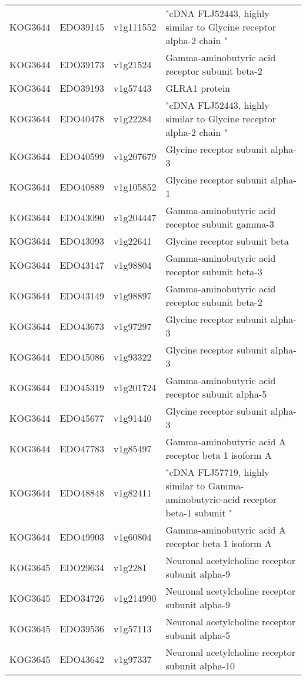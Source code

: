 \begin{longtable}[l]{lll>{\raggedright\arraybackslash}p{30em}}
\rowcolor{gray!6}  KOG3644 & EDO39145 & v1g111552 & "cDNA FLJ52443, highly similar to Glycine receptor alpha-2 chain "\\
KOG3644 & EDO39173 & v1g21524 & Gamma-aminobutyric acid receptor subunit beta-2\\
\rowcolor{gray!6}  KOG3644 & EDO39193 & v1g57443 & GLRA1 protein\\
KOG3644 & EDO40478 & v1g22284 & "cDNA FLJ52443, highly similar to Glycine receptor alpha-2 chain "\\
\rowcolor{gray!6}  KOG3644 & EDO40599 & v1g207679 & Glycine receptor subunit alpha-3\\
KOG3644 & EDO40889 & v1g105852 & Glycine receptor subunit alpha-1\\
\rowcolor{gray!6}  KOG3644 & EDO43090 & v1g204447 & Gamma-aminobutyric acid receptor subunit gamma-3\\
KOG3644 & EDO43093 & v1g22641 & Glycine receptor subunit beta\\
\rowcolor{gray!6}  KOG3644 & EDO43147 & v1g98804 & Gamma-aminobutyric acid receptor subunit beta-3\\
KOG3644 & EDO43149 & v1g98897 & Gamma-aminobutyric acid receptor subunit beta-2\\
\rowcolor{gray!6}  KOG3644 & EDO43673 & v1g97297 & Glycine receptor subunit alpha-3\\
KOG3644 & EDO45086 & v1g93322 & Glycine receptor subunit alpha-3\\
\rowcolor{gray!6}  KOG3644 & EDO45319 & v1g201724 & Gamma-aminobutyric acid receptor subunit alpha-5\\
KOG3644 & EDO45677 & v1g91440 & Glycine receptor subunit alpha-3\\
\rowcolor{gray!6}  KOG3644 & EDO47783 & v1g85497 & Gamma-aminobutyric acid A receptor beta 1 isoform A\\
KOG3644 & EDO48848 & v1g82411 & "cDNA FLJ57719, highly similar to Gamma-aminobutyric-acid receptor beta-1 subunit "\\
\rowcolor{gray!6}  KOG3644 & EDO49903 & v1g60804 & Gamma-aminobutyric acid A receptor beta 1 isoform A\\
KOG3645 & EDO29634 & v1g2281 & Neuronal acetylcholine receptor subunit alpha-9\\
\rowcolor{gray!6}  KOG3645 & EDO34726 & v1g214990 & Neuronal acetylcholine receptor subunit alpha-9\\
KOG3645 & EDO39536 & v1g57113 & Neuronal acetylcholine receptor subunit alpha-5\\
\rowcolor{gray!6}  KOG3645 & EDO43642 & v1g97337 & Neuronal acetylcholine receptor subunit alpha-10\\

\end{longtable}
